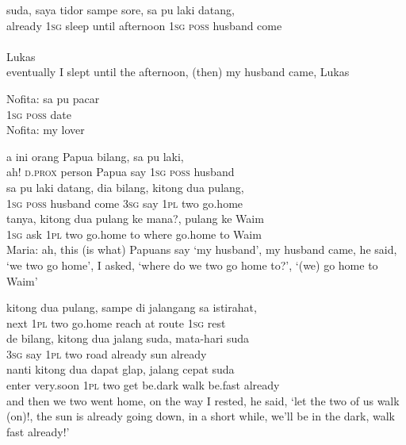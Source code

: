 \ea
\gll   suda,   saya   tidor   sampe   sore,   sa   pu   laki   datang,\\
  already   \textsc{1sg}   sleep   until   afternoon   \textsc{1sg}   \textsc{poss}   husband   come\\
\\
   {Lukas}\\
\glt
eventually I slept until the afternoon, (then) my husband came, Lukas
\z

\ea
\gll   Nofita:   sa   pu   pacar\\
{}  \textsc{1sg}   \textsc{poss}   date\\
\glt
Nofita: my lover

\z

\ea
{}    {a}    {ini}    {orang}    {Papua}    {bilang,}    {sa}    {pu}    {laki,}\\
   {}    {ah!}    {\textsc{d.prox}}    {person}    {Papua}    {say}    {\textsc{1sg}}    {\textsc{poss}}    {husband}\\
\gll sa    {pu}    {laki}    {datang,}   dia    {bilang,}    {kitong}    {dua}    {pulang,}\\
  \textsc{1sg}    {\textsc{poss}}    {husband}    {come}   \textsc{3sg}    {say}    {\textsc{1pl}}    {two}    {go.home}\\
    {tanya,}   kitong    {dua}    {pulang}    {ke}    {mana?,}    {pulang}    {ke}   Waim\\
   {\textsc{1sg}}    {ask}   \textsc{1pl}    {two}    {go.home}    {to}    {where}    {go.home}    {to}   Waim\\
\glt
Maria: ah, this (is what) Papuans say ‘my husband’, my husband came, he said, ‘we two go home’, I asked, ‘where do we two go home to?’, ‘(we) go home to Waim’
\z

\ea
{}    {kitong}   dua    {pulang,}    {sampe}    {di}    {jalangang}    {sa}    {istirahat,}\\
   {next}    {\textsc{1pl}}   two    {go.home}    {reach}    {at}    {route}    {\textsc{1sg}}    {rest}\\
\gll de    {bilang,}    {kitong}    {dua}    {jalang}    {suda,}    {mata-hari}    {suda}\\
  \textsc{3sg}    {say}    {\textsc{1pl}}    {two}    {road}    {already}    {sun}    {already}\\
    {nanti}    {kitong}    {dua}    {dapat}    {glap,}    {jalang}    {cepat}   suda\\
   {enter}    {very.soon}    {\textsc{1pl}}    {two}    {get}    {be.dark}    {walk}    {be.fast}   already\\
\glt
and then we two went home, on the way I rested, he said, ‘let the two of us walk (on)!, the sun is already going down, in a short while, we’ll be in the dark, walk fast already!’
\z

